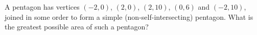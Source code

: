 A pentagon has vertices $(-2,0)$, $(2,0)$, $(2,10)$, $(0,6)$ and $(-2,10)$, joined in some order to form a simple (non-self-intersecting) pentagon. What is the greatest possible area of such a pentagon?
